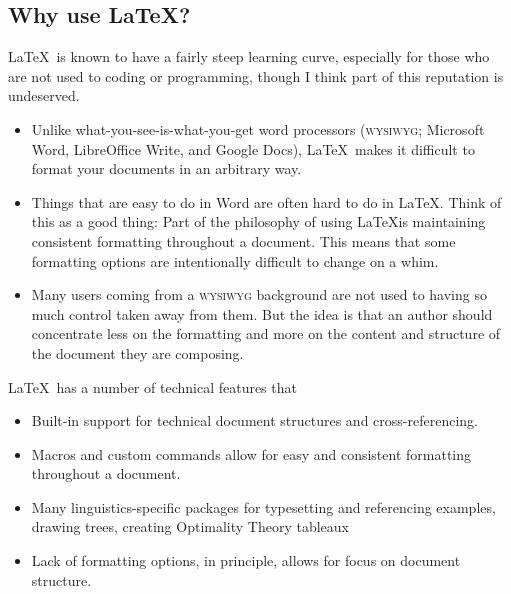 \documentclass[11pt, letterpaper]{article}
\begin{document}
  
  \subsection{Why use \LaTeX?}
  
    \LaTeX\ is known to have a fairly steep learning curve, especially for those who are not used to coding or programming, though I think part of this reputation is undeserved.
    
      \begin{itemize}
	\item Unlike what-you-see-is-what-you-get word processors (\textsc{wysiwyg}; Microsoft Word, LibreOffice Write, and Google Docs), \LaTeX\ makes it difficult to format your documents in an arbitrary way.
	
	\item Things that are easy to do in Word are often hard to do in \LaTeX. Think of this as a good thing: Part of the philosophy of using \LaTeX is maintaining consistent formatting throughout a document. This means that some formatting options are intentionally difficult to change on a whim.
	
	\item Many users coming from a \textsc{wysiwyg} background are not used to having so much control taken away from them. But the idea is that an author should concentrate less on the formatting and more on the content and structure of the document they are composing.
	
      \end{itemize}

    \noindent \LaTeX\ has a number of technical features that 
  
      \begin{itemize}
	
	\item Built-in support for technical document structures and cross-referencing.
	
	\item Macros and custom commands allow for easy and consistent formatting throughout a document.
		
	\item Many linguistics-specific packages for typesetting and referencing examples, drawing trees, creating Optimality Theory tableaux
	
	\item Lack of formatting options, in principle, allows for focus on document structure.
	
      \end{itemize}
      
\end{document}
